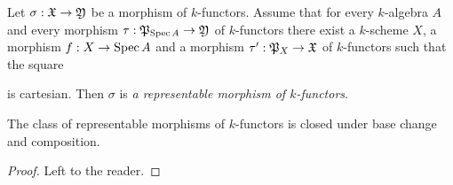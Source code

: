 \begin{definition}
Let $\sigma:{\mathfrak X}\rightarrow {\mathfrak Y}$ be a morphism of $k$-functors. Assume that for every $k$-algebra $A$ and every morphism $\tau:{\mathfrak P}_{\mathrm{Spec}\, A}\rightarrow {\mathfrak Y}$ of $k$-functors there exist a $k$-scheme $X$, a morphism $f:X\rightarrow \mathrm{Spec}\, A$ and a morphism $\tau':{\mathfrak P}_{X}\rightarrow {\mathfrak X}$ of $k$-functors such that the square
\begin{center}
\end{center}
is cartesian. Then $\sigma$ is \textit{a representable morphism of $k$-functors}.
\end{definition}

\begin{fact}\label{fact:representablemorphismsunderbasechangeandcomposition}
The class of representable morphisms of $k$-functors is closed under base change and composition.
\end{fact}
\begin{proof}
Left to the reader.
\end{proof}

